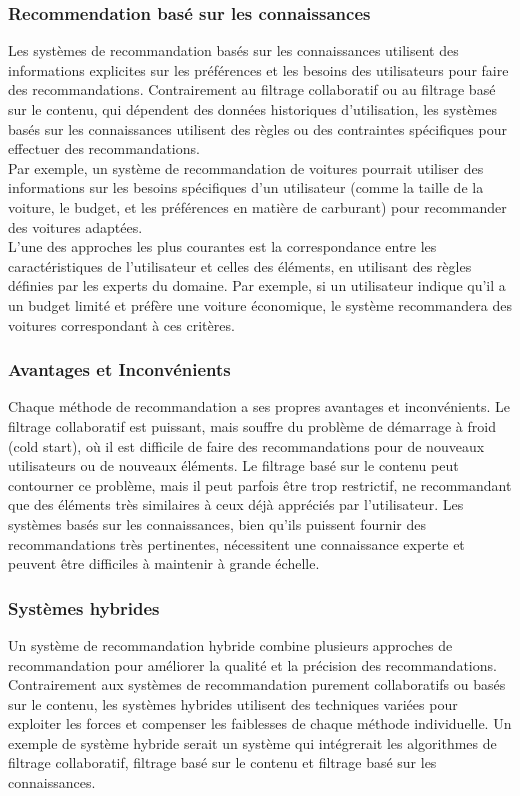 \documentclass[11pt]{article}
\begin{document}
\subsubsection{Recommendation basé sur les connaissances}
Les \cite{burke2000knowledge} systèmes de recommandation basés sur les connaissances utilisent des informations explicites sur les préférences et les besoins des utilisateurs pour faire des recommandations. Contrairement au filtrage collaboratif ou au filtrage basé sur le contenu, qui dépendent des données historiques d'utilisation, les systèmes basés sur les connaissances utilisent des règles ou des contraintes spécifiques pour effectuer des recommandations.\\

Par exemple, un système de recommandation de voitures pourrait utiliser des informations sur les besoins spécifiques d'un utilisateur (comme la taille de la voiture, le budget, et les préférences en matière de carburant) pour recommander des voitures adaptées.\\

L'une des approches les plus courantes est la correspondance entre les caractéristiques de l'utilisateur et celles des éléments, en utilisant des règles définies par les experts du domaine. Par exemple, si un utilisateur indique qu'il a un budget limité et préfère une voiture économique, le système recommandera des voitures correspondant à ces critères.

\subsubsection{Avantages et Inconvénients}

Chaque méthode de recommandation a ses propres avantages et inconvénients. Le filtrage collaboratif est puissant, mais souffre du problème de démarrage à froid (cold start), où il est difficile de faire des recommandations pour de nouveaux utilisateurs ou de nouveaux éléments. Le filtrage basé sur le contenu peut contourner ce problème, mais il peut parfois être trop restrictif, ne recommandant que des éléments très similaires à ceux déjà appréciés par l'utilisateur. Les systèmes basés sur les connaissances, bien qu'ils puissent fournir des recommandations très pertinentes, nécessitent une connaissance experte et peuvent être difficiles à maintenir à grande échelle.

\subsubsection{Systèmes hybrides}
Un \cite{burke2002hybrid} système de recommandation hybride combine plusieurs approches de recommandation pour améliorer la qualité et la précision des recommandations. Contrairement aux systèmes de recommandation purement collaboratifs ou basés sur le contenu, les systèmes hybrides utilisent des techniques variées pour exploiter les forces et compenser les faiblesses de chaque méthode individuelle. Un exemple de système hybride serait un système qui intégrerait les algorithmes de filtrage collaboratif, filtrage basé sur le contenu et filtrage basé sur les connaissances. \\
\end{document}
